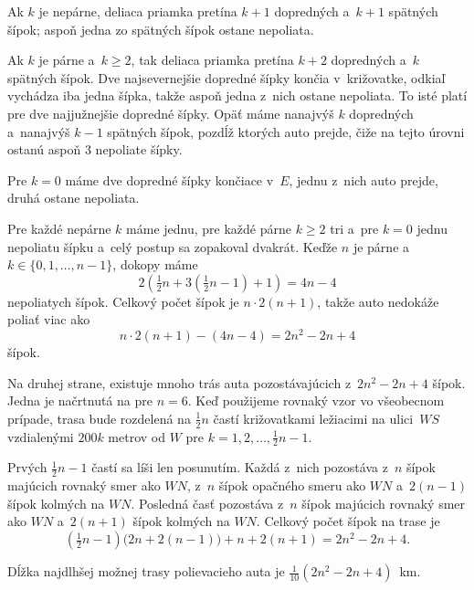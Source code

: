 {Ak $k$ je nepárne, deliaca priamka pretína $k+1$ dopredných a~$k+1$ spätných šípok; aspoň jedna zo spätných šípok ostane nepoliata.

Ak $k$ je párne a~$k\ge2$, tak deliaca priamka pretína $k+2$ dopredných a~$k$ spätných šípok. Dve najsevernejšie dopredné šípky končia v~križovatke, odkiaľ vychádza iba jedna šípka, takže aspoň jedna z~nich ostane nepoliata. To isté platí pre dve najjužnejšie dopredné šípky. Opäť máme nanajvýš $k$ dopredných a~nanajvýš $k-1$ spätných šípok, pozdĺž ktorých auto prejde, čiže na tejto úrovni ostanú aspoň 3 nepoliate šípky.

Pre $k=0$ máme dve dopredné šípky končiace v~$E$, jednu z~nich auto prejde, druhá ostane nepoliata.

\smallskip
Pre každé nepárne $k$ máme jednu, pre každé párne $k\ge2$ tri a~pre $k=0$ jednu nepoliatu šípku a~celý postup sa zopakoval dvakrát. Keďže $n$ je párne a~$k\in\{0,1,\dots,{n-1}\}$, dokopy máme
$$
2\left(\tfrac12n+3(\tfrac12n-1)+1\right)=4n-4
$$
nepoliatych šípok. Celkový počet šípok je $n\cdot 2(n+1)$, takže auto nedokáže poliať viac ako
$$
n\cdot 2(n+1)-(4n-4)=2n^2-2n+4
$$
šípok.

\smallskip
Na druhej strane, existuje mnoho trás auta pozostávajúcich z~$2n^2-2n+4$ šípok. Jedna je načrtnutá na \obr{} pre $n=6$. Keď použijeme rovnaký vzor vo všeobecnom prípade, trasa bude rozdelená na $\frac12n$ častí križovatkami ležiacimi na ulici~$WS$ vzdialenými $200k$ metrov od $W$ pre $k=1,2,\dots,\frac12n-1$.
%

Prvých $\frac12n-1$ častí sa líši len posunutím. Každá z~nich pozostáva z~$n$ šípok majúcich rovnaký smer ako $WN$, z~$n$ šípok opačného smeru ako $WN$ a~$2(n-1)$ šípok kolmých na $WN$. Posledná časť pozostáva z~$n$ šípok majúcich rovnaký smer ako $WN$ a~$2(n+1)$ šípok kolmých na $WN$. Celkový počet šípok na trase je
$$
\left(\tfrac12n-1\right)\bigl(2n+2(n-1)\bigr)+n+2(n+1)=2n^2-2n+4.
$$

\odpoved
Dĺžka najdlhšej možnej trasy polievacieho auta je $\frac1{10}(2n^2-2n+4)$~km.
}

